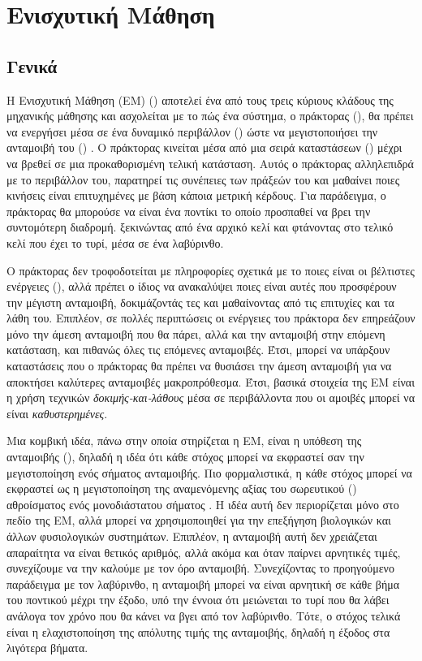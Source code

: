 \chapter{Ενισχυτική Μάθηση}
\label{chap:rl}
\section{Γενικά}

Η Ενισχυτική Μάθηση (ΕΜ) () αποτελεί ένα από τους τρεις κύριους κλάδους της μηχανικής
μάθησης και ασχολείται με το πώς ένα σύστημα, ο πράκτορας (), θα πρέπει να ενεργήσει μέσα σε ένα δυναμικό
περιβάλλον () ώστε να μεγιστοποιήσει την ανταμοιβή του () \cite{aigreek}. Ο πράκτορας κινείται μέσα από μια σειρά
καταστάσεων () μέχρι να βρεθεί σε μια προκαθορισμένη τελική κατάσταση\cite{drlmaze}.
Αυτός ο πράκτορας αλληλεπιδρά με το περιβάλλον του, παρατηρεί τις συνέπειες των πράξεών του και
μαθαίνει ποιες κινήσεις είναι επιτυχημένες με βάση κάποια μετρική κέρδους. Για παράδειγμα,
ο πράκτορας θα μπορούσε να είναι ένα ποντίκι το οποίο προσπαθεί να βρει την συντομότερη διαδρομή. ξεκινώντας από
ένα αρχικό κελί και φτάνοντας στο τελικό κελί που έχει το τυρί, μέσα σε ένα λαβύρινθο.

Ο πράκτορας δεν τροφοδοτείται με πληροφορίες σχετικά με το ποιες είναι οι βέλτιστες ενέργειες (),
αλλά πρέπει ο ίδιος να ανακαλύψει ποιες είναι αυτές που προσφέρουν την μέγιστη ανταμοιβή, δοκιμάζοντάς τες \cite{rlbook} και
μαθαίνοντας από τις επιτυχίες και τα λάθη του.
Επιπλέον, σε πολλές περιπτώσεις οι ενέργειες του πράκτορα δεν επηρεάζουν μόνο την άμεση ανταμοιβή που θα πάρει,
αλλά και την ανταμοιβή στην επόμενη κατάσταση, και πιθανώς όλες τις επόμενες ανταμοιβές. Έτσι, μπορεί να υπάρξουν
καταστάσεις που ο πράκτορας θα πρέπει να θυσιάσει την άμεση ανταμοιβή για να αποκτήσει καλύτερες ανταμοιβές μακροπρόθεσμα.
Έτσι, βασικά στοιχεία της ΕΜ είναι η χρήση τεχνικών \textit{δοκιμής-και-λάθους } μέσα σε περιβάλλοντα
που οι αμοιβές μπορεί να είναι \textit{καθυστερημένες}.

Μια κομβική ιδέα, πάνω στην οποία στηρίζεται η ΕΜ, είναι η υπόθεση της ανταμοιβής (), δηλαδή η ιδέα
ότι κάθε στόχος μπορεί να εκφραστεί σαν την μεγιστοποίηση ενός σήματος ανταμοιβής. Πιο φορμαλιστικά, η κάθε στόχος
μπορεί να εκφραστεί ως η μεγιστοποίηση της αναμενόμενης αξίας του σωρευτικού () αθροίσματος ενός μονοδιάστατου
σήματος \cite{rlbook}. Η ιδέα αυτή δεν περιορίζεται μόνο στο πεδίο της ΕΜ, αλλά μπορεί να χρησιμοποιηθεί για την επεξήγηση βιολογικών
και άλλων φυσιολογικών συστημάτων.
Επιπλέον, η ανταμοιβή αυτή δεν χρειάζεται απαραίτητα να είναι θετικός αριθμός, αλλά ακόμα και όταν παίρνει αρνητικές τιμές, συνεχίζουμε να την καλούμε
με τον όρο ανταμοιβή. Συνεχίζοντας το προηγούμενο παράδειγμα με τον λαβύρινθο, η ανταμοιβή μπορεί να είναι αρνητική σε κάθε βήμα του ποντικού
μέχρι την έξοδο, υπό την έννοια ότι μειώνεται το τυρί που θα λάβει ανάλογα τον χρόνο που θα κάνει να βγει από τον λαβύρινθο.
Τότε, ο στόχος τελικά είναι η ελαχιστοποίηση της απόλυτης τιμής της ανταμοιβής, δηλαδή η έξοδος στα λιγότερα βήματα.

